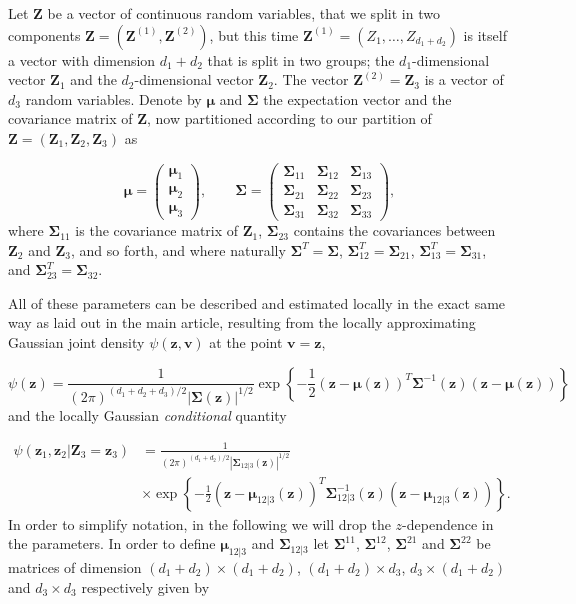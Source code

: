 \documentclass[
  12pt,
  letterpaper]{article}
\numberwithin{equation}{section}
\newcommand{\Z}{\bm{Z}}
\newcommand{\z}{\bm{z}}
\newcommand{\Zone}{\bm{Z}^{(1)}}
\newcommand{\Ztwo}{\bm{Z}^{(2)}}
\newcommand{\fv}{\bm{v}}
\newcommand{\fmu}{\bm{\mu}}
\newcommand{\fSigma}{\bm{\Sigma}}
\begin{document}
Let \(\Z\) be a vector of continuous random variables, that we split in two components \(\Z = (\Zone, \Ztwo)\), but this time \(\Zone = (Z_1, \ldots, Z_{d_1 + d_2})\) is itself a vector with dimension \(d_1 + d_2\) that is split in two groups; the \(d_1\)-dimensional vector \(\Z_1\) and the \(d_2\)-dimensional vector \(\Z_2\). The vector \(\Ztwo = \Z_3\) is a vector of \(d_3\) random variables. Denote by \(\fmu\) and \(\fSigma\) the expectation vector and the covariance matrix of \(\Z\), now partitioned according to our partition of \(\Z = (\Z_1, \Z_2, \Z_3)\) as

\[\fmu = \begin{pmatrix} \fmu_1 \\ \fmu_2 \\ \fmu_3 \end{pmatrix}, \qquad \fSigma = \begin{pmatrix} \fSigma_{11} & \fSigma_{12} & \fSigma_{13} \\ \fSigma_{21} & \fSigma_{22} & \fSigma_{23} \\ \fSigma_{31} & \fSigma_{32} & \fSigma_{33} \end{pmatrix},\]
where \(\fSigma_{11}\) is the covariance matrix of \(\Z_1\), \(\fSigma_{23}\) contains the covariances between \(\Z_2\) and \(\Z_3\), and so forth, and where naturally \(\fSigma^T = \fSigma\), \(\fSigma_{12}^T = \fSigma_{21}\), \(\fSigma_{13}^T = \fSigma_{31}\), and \(\fSigma_{23}^T = \fSigma_{32}\).

All of these parameters can be described and estimated locally in the exact same way as laid out in the main article, resulting from the locally approximating Gaussian joint density \(\psi(\z,\fv)\) at the point \(\fv = \z\),

\begin{equation}
\psi(\z) = \frac{1}{(2\pi)^{(d_1+d_2+d_3)/2}|\fSigma(\z)|^{1/2}} \exp \left\{-\frac{1}{2}(\z - \fmu(\z))^T\fSigma^{-1}(\z)(\z - \fmu(\z))\right\}
\label{eq:localgaussian0}
\end{equation}
and the locally Gaussian \emph{conditional} quantity

\begin{align*}
\psi(\z_1, \z_2 | \Z_3 = \z_3) & = \frac{1}{(2\pi)^{(d_1+d_2)/2}|\fSigma_{12|3}(\z)|^{1/2}} \nonumber  \\ 
\qquad\qquad\qquad & \times \exp \left\{-\frac{1}{2}(\z - \fmu_{12|3}(\z))^T\fSigma_{12|3}^{-1}(\z)(\z - \fmu_{12|3}(\z))\right\}.
\end{align*}
In order to simplify notation, in the following we will drop the \(z\)-dependence in the parameters. In order to define \(\fmu_{12|3}\) and \(\fSigma_{12|3}\) let \(\fSigma^{11}\), \(\fSigma^{12}\), \(\fSigma^{21}\) and \(\fSigma^{22}\) be matrices of dimension \((d_1 + d_2) \times (d_1 + d_2)\), \((d_1 + d_2) \times d_3\), \(d_3 \times (d_1 + d_2)\) and \(d_3 \times d_3\) respectively given by
\end{document}
